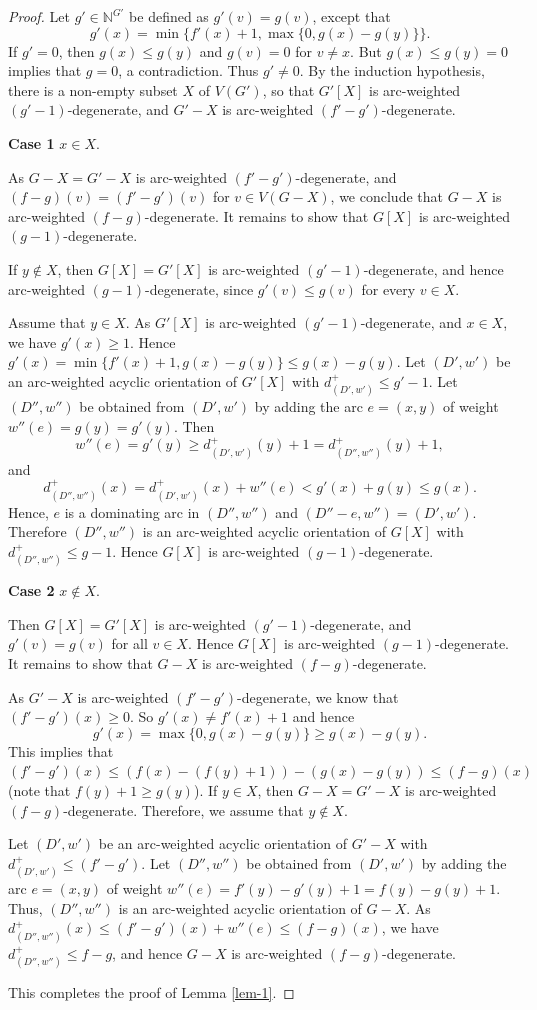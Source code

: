 \documentclass[10pt,a4paper]{amsart}
\begin{document}
\begin{proof}
    Let $g' \in \mathbb{N}^{G'}$ be defined as $g'(v)=g(v)$, except that $$g'(x)=\min\{f'(x)+1, \max\{0,g(x)-g(y)\}\}.$$ 
   If $g'=0$, then  $g(x) \le g(y)$ and $g(v)=0$ for $v \ne x$. But $g(x) \le g(y) = 0$ implies that $g=0$, a contradiction.
   Thus $g' \ne 0$. By the induction hypothesis,  there is a non-empty   subset $X$ of $V(G')$, so that 
$G'[X]$ is arc-weighted  $(g'-1)$-degenerate, and $G'-X$ is arc-weighted   $(f'-g')$-degenerate. 

\bigskip 
\noindent
{\bf Case 1}  $x \in X$. 



As $G-X=G'-X$ is arc-weighted   $(f'-g')$-degenerate, and $(f-g)(v)= (f'-g')(v)$ for $v \in V(G-X)$,   we conclude that  $G-X $ is arc-weighted  $(f-g)$-degenerate. 
It remains to show that $G[X]$ is arc-weighted $(g-1)$-degenerate.

If $y \notin X$, then
$G[X]=G'[X]$ is arc-weighted  $(g'-1)$-degenerate, and hence arc-weighted $(g-1)$-degenerate, since $g'(v)\le g(v)$ for every $v\in X$. 


Assume that $y \in X$.
 As $G'[X]$ is arc-weighted   $(g'-1)$-degenerate, and $x \in X$, we have   $g'(x) \ge 1$.  Hence 
$g'(x) = \min\{f'(x)+1, g(x)-g(y)\} \le g(x)-g(y)$.  Let $(D',w')$ be  an arc-weighted   acyclic orientation  of $G'[X]$ with $d_{(D',w')}^+  \le g'-1$. 
 Let $(D'',w'')$ be obtained from $(D',w')$ by adding the arc $e=(x,y)$ of weight $w''(e)= g(y)=g'(y)$. Then $$w''(e)   = g'(y)   \ge d_{(D',w')}^+(y)+1 = d_{(D'',w'')}^+(y)+1,$$
and $$d_{(D'',w'')}^+(x) = d_{(D',w')}^+(x)+w''(e) < g'(x)+g(y) \le  g(x).$$
Hence, $e$ is a dominating arc in $(D'',w'')$ and $(D''-e,w'') = (D',w')$. Therefore $(D'',w'')$ is an arc-weighted acyclic orientation of $G[X]$ with 
$ d_{(D'',w'')}^+  \le  g-1$. Hence $G[X]$ is arc-weighted   $(g-1)$-degenerate. 



\bigskip 
\noindent
{\bf Case 2}   $x \notin X$. 

Then  $G[X] = G'[X]$ is arc-weighted  $(g'-1)$-degenerate,  and $g'(v)=g(v)$ for all $v \in X$. Hence $G[X]$ is arc-weighted   $(g-1)$-degenerate. 
It remains to show that $G-X$ is arc-weighted $(f-g)$-degenerate.

As $G'-X$ is arc-weighted $(f'-g')$-degenerate,  we know that $(f'-g')(x) \ge 0$. So $g'(x) \ne f'(x)+1$ and hence $$ g'(x)= \max\{0, g(x)-g(y)\} \ge g(x)-g(y).$$ 
This implies that $(f'-g')(x) \le (f(x)-(f(y)+1)) - (g(x)-g(y)) \le (f-g)(x)$   (note that $f(y)+1 \ge g(y)$). 
If   $y \in X$,   then   $G-X = G'-X$ is arc-weighted  $(f-g)$-degenerate. 
  Therefore, we assume that $y \notin X$. 

  Let $(D',w')$ be an arc-weighted  acyclic orientation of $G'-X$ with $d_{(D',w')}^+   \le (f'-g')$.  
  Let $(D'',w'')$ be obtained from $(D',w')$ by adding the arc $e=(x,y)$ of weight $w''(e)=f'(y)-g'(y)+1=f(y)-g(y)+1$. Thus, $(D'',w'')$ is an arc-weighted   acyclic orientation of $G-X$. As $d_{(D'',w'')}^+(x)   \le (f'-g')(x) + w''(e) \le (f-g)(x)$, we have  $d_{(D'',w'')}^+  \le f-g$, and hence $G-X$ is arc-weighted   $(f-g)$-degenerate.
 
   This completes the proof of Lemma \ref{lem-1}.
		\end{proof}	
\end{document}
